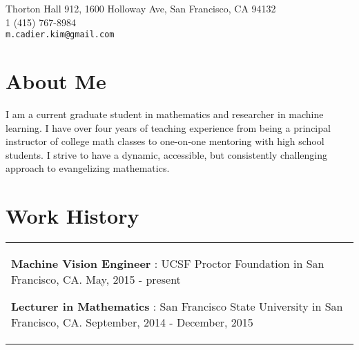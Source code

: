 \documentclass[margin,line,pifont,palatino,courier]{res}
\newenvironment{list1}{
  \begin{list}{\label{ } }{
      \setlength{\itemsep}{0in}
      \setlength{\parsep}{0in} \setlength{\parskip}{0in}
      \setlength{\topsep}{0in} \setlength{\partopsep}{0in}
      \setlength{\leftmargin}{0.0in} } }{\end{list} }
\begin{document}


\begin{resume}




\begin{flushright}
{\small
Thorton Hall 912, 1600 Holloway Ave, San Francisco, CA 94132 \\
1 (415) 767-8984\\
  \verb+m.cadier.kim@gmail.com+
}
\end{flushright}
 
\section{\sc  About Me}
    
      
          
      
          
      
          
      
          
            I am a current graduate student in mathematics and researcher in machine learning.  I have over four years of teaching experience from being a principal instructor of college math classes to one-on-one mentoring with high school students.   I strive to have a dynamic, accessible, but consistently challenging approach to evangelizing mathematics. 
          
      


\section{\sc  Work History}
\begin{tabular}{@{}p{5in}}
  \begin{list1}
    
    
       
      \item {\bf Machine Vision Engineer  }:  UCSF Proctor Foundation in San Francisco, CA. May, 2015 - present
      \vspace{.2em}
    
       
      \item {\bf Lecturer in Mathematics }:  San Francisco State University in San Francisco, CA. September, 2014 - December, 2015
      \vspace{.2em}
    

\end{list1}
\end{tabular}
\end{resume}
\end{document}
